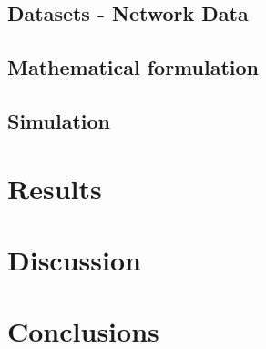 \subsection{Datasets - Network Data}
\subsection{Mathematical formulation}
\subsection{Simulation}

\section{Results}
\section{Discussion}
\section{Conclusions}


